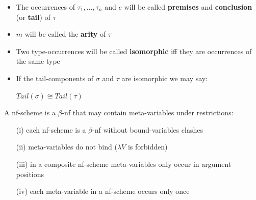 \begin{frame}

\begin{notation}
\begin{itemize}
 \item The occurrences of $\tau_1,...,\tau_n$ and $e$ will be called \textbf{premises} and \textbf{conclusion} (or \textbf{tail}) of $\tau$\\[0.3cm]
 
 \item $m$ will be called the \textbf{arity} of $\tau$\\[0.3cm]
 
 \item Two type-occurrences will be called \textbf{isomorphic} iff they are occurrences of the same type\\[0.3cm]
 
 \item If the tail-components of $\sigma$ and $\tau$ are isomorphic we may say:
\begin{center}
 $Tail(\sigma) \cong Tail(\tau)$ 
\end{center}
 
\end{itemize}

\end{notation}
  
\begin{mydef}[nf-schemes]
 A nf-scheme is a $\beta$-nf that may contain meta-variables under restrictions:
 \begin{itemize}
  \item[(i)] each nf-scheme is a $\beta$-nf without bound-variables clashes
  \item[(ii)] meta-variables do not bind ($\lambda V$ is forbidden)
  \item[(iii)] in a composite nf-scheme meta-variables only occur in argument positions
  \item[(iv)] each meta-variable in a nf-scheme occurs only once
 \end{itemize}
\end{mydef}
  
\end{frame}



